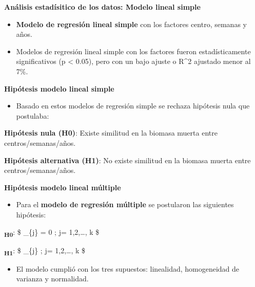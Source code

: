 \documentclass[
  ignorenonframetext,
]{beamer}
\providecommand{\tightlist}{%
  \setlength{\itemsep}{0pt}\setlength{\parskip}{0pt}}
\begin{document}
\begin{frame}{\textbf{Análisis estadísitico de los datos: Modelo lineal
simple}}
\protect\hypertarget{anuxe1lisis-estaduxedsitico-de-los-datos-modelo-lineal-simple}{}
\begin{itemize}
\item
  \textbf{Modelo de regresión lineal simple} con los factores centro,
  semanas y años.
\item
  Modelos de regresión lineal simple con los factores fueron
  estadísticamente significativos (p \textless{} 0.05), pero con un bajo
  ajuste o R\^{}2 ajustado menor al 7\%.
\end{itemize}
\end{frame}

\begin{frame}{\textbf{Hipótesis modelo lineal simple}}
\protect\hypertarget{hipuxf3tesis-modelo-lineal-simple}{}
\begin{itemize}
\tightlist
\item
  Basado en estos modelos de regresión simple se rechaza hipótesis nula
  que postulaba:
\end{itemize}

\textbf{Hipótesis nula (H0)}: Existe similitud en la biomasa muerta
entre centros/semanas/años.

\textbf{Hipótesis alternativa (H1)}: No existe similitud en la biomasa
muerta entre centros/semanas/años.
\end{frame}

\begin{frame}{\textbf{Hipótesis modelo lineal múltiple}}
\protect\hypertarget{hipuxf3tesis-modelo-lineal-muxfaltiple}{}
\begin{itemize}
\tightlist
\item
  Para el \textbf{modelo de regresión múltiple} se postularon las
  siguientes hipótesis:
\end{itemize}

\textbf{\textsubscript{H0}}: \$ \beta\_\{j\} = 0 ; j= 1,2,\ldots, k \$

\textbf{\textsubscript{H1}}: \$ \beta\_\{j\}  ; j= 1,2,\ldots, k \$

\begin{itemize}
\tightlist
\item
  El modelo cumplió con los tres supuestos: linealidad, homogeneidad de
  varianza y normalidad.
\end{itemize}
\end{frame}
\end{document}
